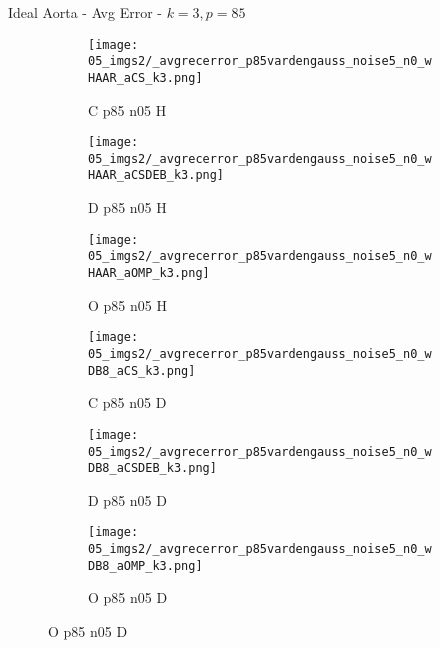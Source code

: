 \begin{frame}{Ideal Aorta - Avg Error - $k=3,p=85$}{}
\begin{figure}
\begin{subfigure}{0.13\textwidth}
\texttt{[image: 05\_imgs2/\_avgrecerror\_p85vardengauss\_noise5\_n0\_wHAAR\_aCS\_k3.png]}
\caption*{\tiny C p85 n05 H}
\end{subfigure}
\begin{subfigure}{0.13\textwidth}
\texttt{[image: 05\_imgs2/\_avgrecerror\_p85vardengauss\_noise5\_n0\_wHAAR\_aCSDEB\_k3.png]}
\caption*{\tiny D p85 n05 H}
\end{subfigure}
\begin{subfigure}{0.13\textwidth}
\texttt{[image: 05\_imgs2/\_avgrecerror\_p85vardengauss\_noise5\_n0\_wHAAR\_aOMP\_k3.png]}
\caption*{\tiny O p85 n05 H}
\end{subfigure}
\begin{subfigure}{0.13\textwidth}
\texttt{[image: 05\_imgs2/\_avgrecerror\_p85vardengauss\_noise5\_n0\_wDB8\_aCS\_k3.png]}
\caption*{\tiny C p85 n05 D}
\end{subfigure}
\begin{subfigure}{0.13\textwidth}
\texttt{[image: 05\_imgs2/\_avgrecerror\_p85vardengauss\_noise5\_n0\_wDB8\_aCSDEB\_k3.png]}
\caption*{\tiny D p85 n05 D}
\end{subfigure}
\begin{subfigure}{0.13\textwidth}
\texttt{[image: 05\_imgs2/\_avgrecerror\_p85vardengauss\_noise5\_n0\_wDB8\_aOMP\_k3.png]}
\caption*{\tiny O p85 n05 D}
\end{subfigure}

\vspace{5pt}


\end{figure}
\end{frame}
